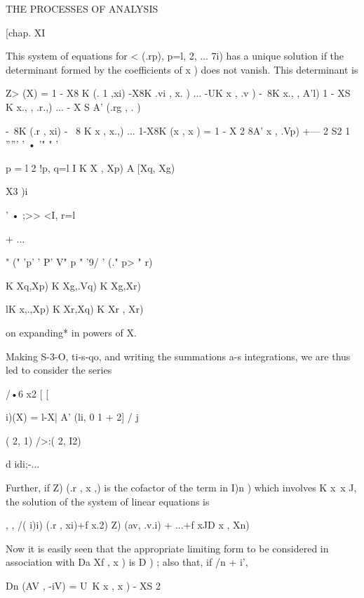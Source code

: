THE PROCESSES OF ANALYSIS 



[chap. XI 



This system of equations for <  (.rp),  p=l, 2, ... 7i) has a unique solution if the 
determinant formed by the coefficients of  x ) does not vanish. This determinant is 

Z>  (X) = 1 - X8 K (. 1 ,xi) -X8K  .vi , x. ) ... -UK  x  , .v ) 
-\ 8K  x., , A'l) 1 - XS K  x., , .r.,) ... - X S A' (.rg , .   ) 



-\ 8K (.r  , xi) - \ 8 K  x , x.,) ... 1-X8K (x  , x ) 
= 1 - X 2 8A'  x , .Vp) +— 2 S2 1   ''''' '    • '" " '  

p = l 2 !p, q=l I K  X , Xp) A [Xq, Xg) 



X3 )i 

'  • ;>> <I, r=l 



+ ... 



 "  (" 'p' ' P' V" p  " '9/  '  (." p> " r) 

K Xq,Xp) K Xg,.Vq) K Xg,Xr) 

lK x,.,Xp) K Xr,Xq) K  Xr  , Xr) 

on expanding* in powers of X. 

Making S-3-O, ti-s-qo, and writing the summations a-s integrations, we are thus led to 
consider the series 



/•6 x2 [  [  

i)(X) = l-X|  A' (li,  0 1 + 2] /  j  



 ( 2, 1) />:( 2, I2) 



d idi;-... 



Further, if Z) (.r , x ,) is the cofactor of the term in I)n  )  which involves K  x\, x J, 
the solution of the system of linear equations is 

, , /( i)i) (.r , xi)+f x.2) Z) (av, .v.i) + ...+f xJD  x , Xn) 

Now it is easily seen that the appropriate limiting form to be considered in association 
with Da  Xf , x ) is D  )  ; also that, if /n + i', 



Dn (AV , -iV) = U\ K  x  , x )  - XS 2 




